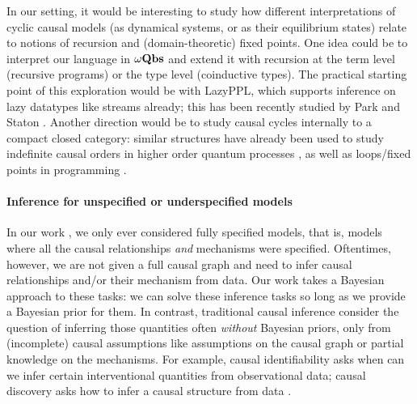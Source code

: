 \documentclass[11pt,a4paper]{article}
\begin{document}
In our setting, it would be interesting to study how different interpretations of cyclic causal models (as dynamical systems, or as their equilibrium states) relate to notions of recursion and (domain-theoretic) fixed points. One idea could be to interpret our language in $\omega\mathbf{Qbs}$  and extend it with recursion at the term level (recursive programs) or the type level (coinductive types). The practical starting point of this exploration would be with LazyPPL, which supports inference on lazy datatypes like streams already; this has been recently studied by Park and Staton . Another direction would be to study causal cycles internally to a compact closed category: similar structures have already been used to study indefinite causal orders in higher order quantum processes , as well as loops/fixed points in programming . 

\paragraph{Inference for unspecified or underspecified models} In our work \cite{wang2026causalppl}, we only ever considered fully specified models, that is, models where all the causal relationships \emph{and} mechanisms were specified. Oftentimes, however, we are not given a full causal graph and need to infer causal relationships and/or their mechanism from data. Our work takes a Bayesian approach to these tasks: we can solve these inference tasks so long as we provide a Bayesian prior for them. In contrast, traditional causal inference \cite{pearl2009causality} consider the question of inferring those quantities often \emph{without} Bayesian priors, only from (incomplete) causal assumptions like assumptions on the causal graph or partial knowledge on the mechanisms. For example, causal identifiability asks when can we infer certain interventional quantities from observational data; causal discovery asks how to infer a causal structure from data . 
\end{document}
